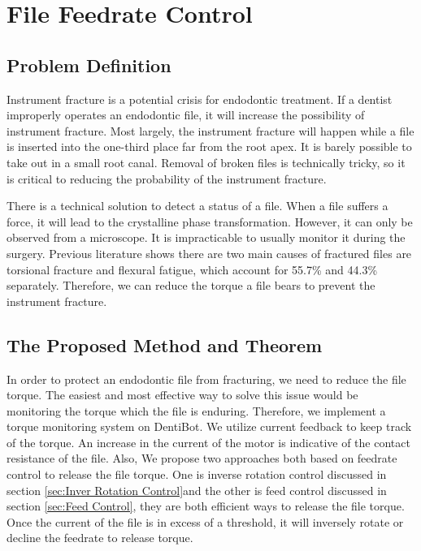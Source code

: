 \chapter{File Feedrate Control}
\section{Problem Definition}
\hspace*{6mm}Instrument fracture is a potential crisis for endodontic treatment. If a dentist improperly operates an endodontic file, it will increase the possibility of instrument fracture. Most largely, the instrument fracture will happen while a file is inserted into the one-third place far from the root apex. It is barely possible to take out in a small root canal. Removal of broken files is technically tricky, so it is critical to reducing the probability of the instrument fracture.
\par
There is a technical solution to detect a status of a file. When a file suffers a force, it will lead to the crystalline phase transformation. However, it can only be observed from a microscope. It is impracticable to usually monitor it during the surgery. Previous literature shows there are two main causes of fractured files are torsional fracture and flexural fatigue, which account for 55.7\% and 44.3\% separately\cite{SATTAPAN2000161}. Therefore, we can reduce the torque a file bears to prevent the instrument fracture.
\section{The Proposed Method and Theorem}
\hspace*{6mm}In order to protect an endodontic file from fracturing, we need to reduce the file torque. The easiest and most effective way to solve this issue would be monitoring the torque which the file is enduring. Therefore, we implement a torque monitoring system on DentiBot. We utilize current feedback to keep track of the torque. An increase in the current of the motor is indicative of the contact resistance of the file. Also, We propose two approaches both based on feedrate control to release the file torque. One is inverse rotation control discussed in section \ref{sec:Inver Rotation Control}and the other is feed control discussed in section \ref{sec:Feed Control}, they are both efficient ways to release the file torque. Once the current of the file is in excess of a threshold, it will inversely rotate or decline the feedrate to release torque. 
